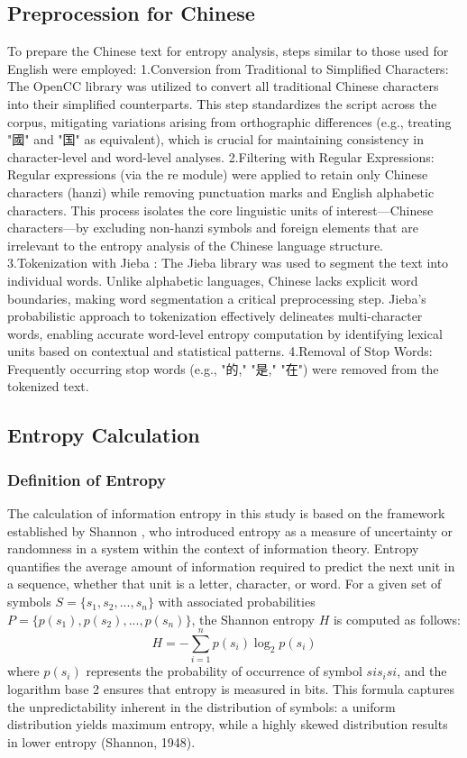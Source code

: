 \documentclass[12pt]{article}
\begin{document}
\subsection*{\centering Preprocession for Chinese}
To prepare the Chinese text for entropy analysis, steps similar to those used for English were employed:
1.Conversion from Traditional to Simplified Characters: The OpenCC \cite{yang2020} library was utilized to convert all traditional Chinese characters into their simplified counterparts. This step standardizes the script across the corpus, mitigating variations arising from orthographic differences (e.g., treating "國" and "国" as equivalent), which is crucial for maintaining consistency in character-level and word-level analyses.
2.Filtering with Regular Expressions: Regular expressions (via the re module) were applied to retain only Chinese characters (hanzi) while removing punctuation marks and English alphabetic characters. This process isolates the core linguistic units of interest—Chinese characters—by excluding non-hanzi symbols and foreign elements that are irrelevant to the entropy analysis of the Chinese language structure.
3.Tokenization with Jieba \cite{jieba}: The Jieba library was used to segment the text into individual words. Unlike alphabetic languages, Chinese lacks explicit word boundaries, making word segmentation a critical preprocessing step. Jieba’s probabilistic approach to tokenization effectively delineates multi-character words, enabling accurate word-level entropy computation by identifying lexical units based on contextual and statistical patterns.
4.Removal of Stop Words: Frequently occurring stop words (e.g., "的," "是," "在") were removed from the tokenized text. 
\subsection*{\centering Entropy Calculation}
\subsubsection*{\centering Definition of Entropy}
The calculation of information entropy in this study is based on the framework established by Shannon \cite{shannon1948}, who introduced entropy as a measure of uncertainty or randomness in a system within the context of information theory. Entropy quantifies the average amount of information required to predict the next unit in a sequence, whether that unit is a letter, character, or word. For a given set of symbols $S = \{s_1, s_2, ..., s_n\} $ with associated probabilities $ P = \{p(s_1), p(s_2), ..., p(s_n)\} ​$, the Shannon entropy $H$ is computed as follows:
\begin{equation}
H=−∑_{i=1}^{n}p(s_i)\log_2p(s_i)
\end{equation}
where $p(s_i)$  represents the probability of occurrence of symbol $si s_i si$​, and the logarithm base 2 ensures that entropy is measured in bits. This formula captures the unpredictability inherent in the distribution of symbols: a uniform distribution yields maximum entropy, while a highly skewed distribution results in lower entropy (Shannon, 1948).
\end{document}
